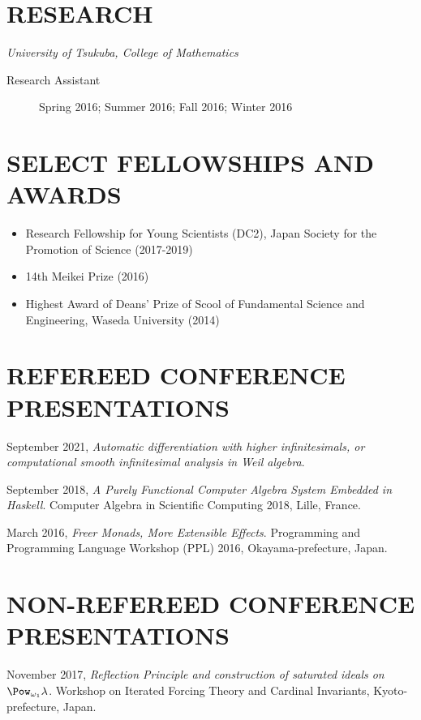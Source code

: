 \documentclass[letterpaper]{scrartcl}
\begin{document}
\section*{RESEARCH}
\emph{University of Tsukuba, College of Mathematics}
\begin{description}
 \item[Research Assistant]  Spring 2016; Summer 2016; Fall 2016; Winter 2016
\end{description}

\section*{SELECT FELLOWSHIPS AND AWARDS}
\begin{itemize}
 \item Research Fellowship for Young Scientists (DC2), Japan Society for the Promotion of Science (2017-2019)
 \item 14th Meikei Prize (2016)
 \item Highest Award of Deans' Prize of Scool of Fundamental Science and Engineering, Waseda University (2014)
\end{itemize}

\section*{REFEREED CONFERENCE PRESENTATIONS}
September 2021, \emph{Automatic differentiation with higher infinitesimals, or computational smooth infinitesimal analysis in Weil algebra}.

September 2018, \emph{A Purely Functional Computer Algebra System Embedded in Haskell}. Computer Algebra in Scientific Computing 2018, Lille, France.

March 2016, \emph{Freer Monads, More Extensible Effects}. Programming and Programming Language Workshop (PPL) 2016, Okayama-prefecture, Japan.

\section*{NON-REFEREED CONFERENCE PRESENTATIONS}
November 2017, \emph{Reflection Principle and construction of saturated ideals on $\Pow_{\omega_1} \lambda$}. Workshop on Iterated Forcing Theory and Cardinal Invariants, Kyoto-prefecture, Japan.

\nocite{ISHII:2016sf,Kiselyov:2015xy,ISHII:2018ek,Ishii:2020aa}
\printbibliography[title=BIBLIOGRAPHY]
\end{document}
